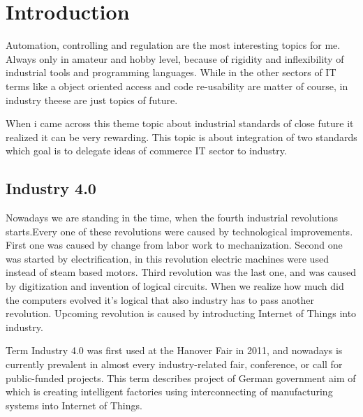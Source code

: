 
\chapter{Introduction} %

\label{Chapter1} %


Automation, controlling and regulation are the most interesting topics for me. 
Always only in amateur and hobby level, because of rigidity and inflexibility of industrial tools and programming languages. 
While in the other sectors of IT terms like a object oriented access and code re-usability are matter of course, in industry theese are just topics of future. 

When i came across this theme topic about industrial standards of close future it realized it can be very rewarding. 
This topic is about integration of two standards which goal is to delegate ideas of commerce IT sector to industry. 


\section{Industry 4.0}
Nowadays we are standing in the time, when the fourth industrial revolutions starts.Every one of these revolutions were caused by technological improvements. First one was caused by change from labor work to mechanization. Second one was started by electrification, in this revolution electric machines were used instead of steam based motors. Third revolution was the last one, and was caused by digitization and invention of logical circuits. When we realize how much did the computers evolved it's logical that also industry has to pass another revolution.
Upcoming revolution is caused by introducting Internet of Things into industry. \cite{brettel2014virtualization}



Term Industry 4.0 was first used at the Hanover Fair in 2011, and nowadays is currently prevalent in almost every industry-related fair, conference, or call for public-funded projects. \cite{Drath2014}
This term describes project of German government aim of which is creating intelligent factories using interconnecting of manufacturing systems into Internet of Things. 



